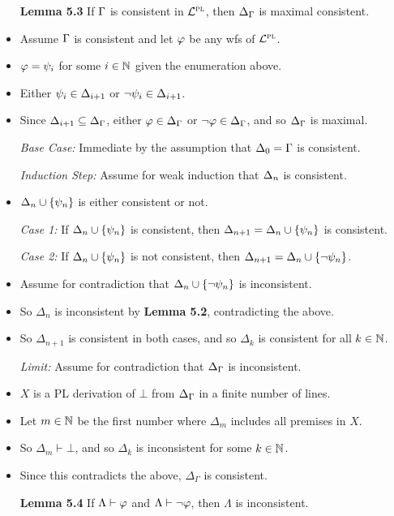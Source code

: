 \documentclass[a4paper, 11pt]{article} %
\begin{document}
\begin{itemize}
  \item[\bf Lemma 5.3] If $\Gamma$ is consistent in $\mathcal{L}^{\textsc{pl}}$, then $\Delta_{\Gamma}$ is maximal consistent. 
    \item Assume $\Gamma$ is consistent and let $\varphi$ be any wfs of $\mathcal{L}^{\textsc{pl}}$.
    \item $\varphi=\psi_i$ for some $i\in\mathbb{N}$ given the enumeration above.
    \item Either $\psi_i\in\Delta_{i+1}$ or $\neg\psi_i\in\Delta_{i+1}$.
    \item Since $\Delta_{i+1}\subseteq\Delta_{\Gamma}$, either $\varphi\in\Delta_{\Gamma}$ or $\neg\varphi\in\Delta_{\Gamma}$, and so $\Delta_{\Gamma}$ is maximal.
    \item[\it Base Case:] Immediate by the assumption that $\Delta_0 = \Gamma$ is consistent. 
    \item[\it Induction Step:] Assume for weak induction that $\Delta_n$ is consistent. 
      \item $\Delta_n\cup\lbrace\psi_n\rbrace$ is either consistent or not.
      \item[\it Case 1:] If $\Delta_n\cup\lbrace\psi_n\rbrace$ is consistent, then $\Delta_{n+1}=\Delta_n\cup\lbrace\psi_n\rbrace$ is consistent. 
      \item[\it Case 2:] If $\Delta_n\cup\lbrace\psi_n\rbrace$ is not consistent, then $\Delta_{n+1}=\Delta_n\cup\lbrace\neg\psi_n\rbrace$.
    \item Assume for contradiction that $\Delta_n\cup\lbrace\neg\psi_n\rbrace$ is inconsistent.
    \item So $\Delta_n$ is inconsistent by \textbf{Lemma 5.2}, contradicting the above. 
    \item So $\Delta_{n+1}$ is consistent in both cases, and so $\Delta_k$ is consistent for all $k \in \mathbb{N}$. 
    \item[\it Limit:] Assume for contradiction that $\Delta_{\Gamma}$ is inconsistent.
    \item $X$ is a PL derivation of $\bot$ from $\Delta_{\Gamma}$ in a finite number of lines.
    \item Let $m \in \mathbb{N}$ be the first number where $\Delta_m$ includes all premises in $X$.
    \item So $\Delta_m\vdash\bot$, and so $\Delta_k$ is inconsistent for some $k\in\mathbb{N}$.
    \item Since this contradicts the above, $\Delta_\Gamma$ is consistent. 
  \item[\bf Lemma 5.4] If $\Lambda\vdash\varphi$ and $\Lambda\vdash\neg\varphi$, then $\Lambda$ is inconsistent.

\end{itemize}
\end{document}
